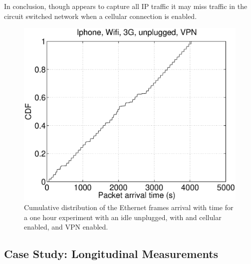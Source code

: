 In conclusion, though \meddle appears to capture all IP traffic it may
miss traffic in the circuit switched network when a cellular connection is enabled.

\begin{figure}
\centering
        \includegraphics[width=0.8\linewidth]{../../code/pushNotification/Fig/bw_iphone_wifi_3g_unplug_vpn_ts.eps}
  \caption{Cumulative distribution of the Ethernet frames
          arrival with time for a one hour experiment with an idle
          \iphone{} unplugged, with \wifi{} and cellular enabled, and VPN
          enabled.}
  \label{fig:push_w3v_ts}
   \vspace{\postfigspace}
\end{figure}


\subsection{Case Study: Longitudinal Measurements }
\label{sec:case-study-google}




